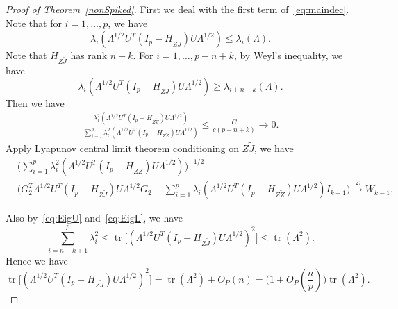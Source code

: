 \documentclass[review]{elsarticle}
\DeclareMathOperator{\mytr}{tr}
\theoremstyle{plain}
\theoremstyle{definition}
\theoremstyle{remark}
\begin{document}
\begin{proof}[\textrm{Proof of Theorem~\ref{nonSpiked}}]
    First we deal with the first term of~\eqref{eq:maindec}.
    Note that for $i=1,\ldots, p$, we have 
    \begin{equation}\label{eq:EigU}
    \lambda_i (\Lambda^{1/2}U^T (I_p-H_{Z\tilde{J}})U\Lambda^{1/2})\leq
    \lambda_i (\Lambda).
    \end{equation}
    Note that $H_{Z\tilde{J}}$ has rank $n-k$. For $i=1,\ldots, p-n+k$, by Weyl's inequality, we have
    \begin{equation}\label{eq:EigL}
    \lambda_i (\Lambda^{1/2}U^T (I_p-H_{Z\tilde{J}})U\Lambda^{1/2})\geq
    \lambda_{i+n-k} (\Lambda).
    \end{equation}
Then we have
    $$
    \begin{aligned}
    \frac{\lambda_1^2(\Lambda^{1/2}U^T(I_p-H_{Z\tilde{Z}})U\Lambda^{1/2})}{\sum_{i=1}^p \lambda_i^2(\Lambda^{1/2}U^T(I_p-H_{Z\tilde{Z}})U\Lambda^{1/2})}
    \leq
        \frac{C}{c(p-n+k)}\to 0.
    \end{aligned}
    $$
    Apply Lyapunov central limit theorem conditioning on $Z\tilde{J}$, we have
    $$
    \begin{aligned}
        &\Big( \sum_{i=1}^p \lambda_i^2(\Lambda^{1/2}U^T(I_p-H_{Z\tilde{Z}})U\Lambda^{1/2})\Big)^{-1/2}\\
        &{\Big( G_2^T \Lambda^{1/2}U^T (I_p-H_{Z\tilde{J}})U\Lambda^{1/2}G_2-\sum_{i=1}^p \lambda_i(\Lambda^{1/2}U^T(I_p-H_{Z\tilde{Z}})U\Lambda^{1/2})I_{k-1}\Big)}
    \xrightarrow{\mathcal{L}} W_{k-1}.
    \end{aligned}
    $$

    Also by~\eqref{eq:EigU} and~\eqref{eq:EigL}, we have
    $$
    \sum_{i=n-k+1}^p \lambda_i^2
    \leq
    \mytr\big[(\Lambda^{1/2}U^T (I_p-H_{Z\tilde{J}})U\Lambda^{1/2})^2\big]\leq
    \mytr(\Lambda^2).
    $$ 
    Hence we have
    $$
    \mytr\big[(\Lambda^{1/2}U^T (I_p-H_{Z\tilde{J}})U\Lambda^{1/2})^2\big]
    =
    \mytr(\Lambda^2)+O_P(n)
    =
    \big(1+O_P(\frac{n}{p})\big)\mytr(\Lambda^2).
    $$ 


\end{proof}
\end{document}
